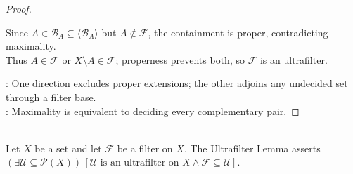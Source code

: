 \begin{theorem}
\begin{proof}
\begin{enumerate}[label=\roman*.]
Since $A\in\mathcal{B}_A\subseteq\langle\mathcal{B}_A\rangle$ but $A\notin\mathcal{F}$, the containment is proper, contradicting maximality.\\
Thus $A\in\mathcal{F}$ or $X\setminus A\in\mathcal{F}$; properness prevents both, so $\mathcal{F}$ is an ultrafilter.
\end{enumerate}
: One direction excludes proper extensions; the other adjoins any undecided set through a filter base.\\
: Maximality is equivalent to deciding every complementary pair.
\end{proof}
\end{theorem}

\begin{principle} \label{princ:ultrafilter-lemma} \\
Let $X$ be a set and let $\mathcal{F}$ be a filter on $X$. The Ultrafilter Lemma asserts $(\exists\mathcal{U}\subseteq\mathcal{P}(X))\,[\mathcal{U}\text{ is an ultrafilter on }X\land\mathcal{F}\subseteq\mathcal{U}]$.
\end{principle}

